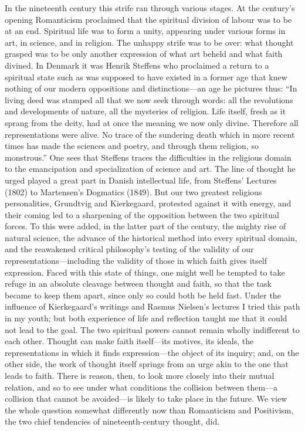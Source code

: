\documentclass[12pt,a4paper]{article}
\newcommand{\opage}[1]{\marginnote{\footnotesize\textit{[#1]}}}
\begin{document}
In the nineteenth century this strife ran through various stages. At the century's
opening Romanticism proclaimed that the spiritual division of labour was to be at an
end. Spiritual life was to form a unity, appearing under various forms in art, in
science, and in religion. The unhappy strife was to be over: what thought grasped was
to be only another expression of what art beheld and what faith divined. In Denmark
it was Henrik Steffens who proclaimed a return to a spiritual state such as was
supposed to have existed in a former age that knew nothing of our modern oppositions
and distinctions---an age he pictures thus: ``In \opage{38}living deed was stamped all that we
now seek through words: all the revolutions and developments of nature, all the
mysteries of religion. Life itself, fresh as it sprang from the deity, had at once
the meaning we now only divine. Therefore all representations were alive. No trace of
the sundering death which in more recent times has made the sciences and poetry, and
through them religion, so monstrous.'' One sees that Steffens traces the difficulties
in the religious domain to the emancipation and specialization of science and art.
The line of thought he urged played a great part in Danish intellectual life, from
Steffens' Lectures (1802) to Martensen's Dogmatics (1849). But our two greatest
religious personalities, Grundtvig and Kierkegaard, protested against it with energy,
and their coming led to a sharpening of the opposition between the two spiritual
forces. To this were added, in the latter part of the century, the mighty rise of
natural science, the advance of the historical method into every spiritual domain,
and the reawakened critical philosophy's testing of the validity of our
representations---including the validity of those in which faith gives itself
expression.
Faced with this state of things, one might well be tempted to take refuge in an
absolute cleavage between thought and faith, so that the task became to keep them
apart, since only so could both be held fast. Under the influence of Kierkegaard's
writings and Rasmus Nielsen's lectures I tried this path in my youth; but both
experience of life and reflection taught me that it could not lead to the goal. The
two spiritual powers cannot remain wholly indifferent to each other. Thought can make
faith itself---its motives, its ideals, the representations in which it finds
expression---the object of its inquiry; and, on the other side, the work of thought
itself springs from an urge akin to the one that leads to faith. There is \opage{39}reason,
then, to look more closely into their mutual relation, and so to see under what
conditions the collision between them---a collision that cannot be avoided---is likely
to take place in the future. We view the whole question somewhat differently now than
Romanticism and Positivism, the two chief tendencies of nineteenth-century thought,
did.
\end{document}
